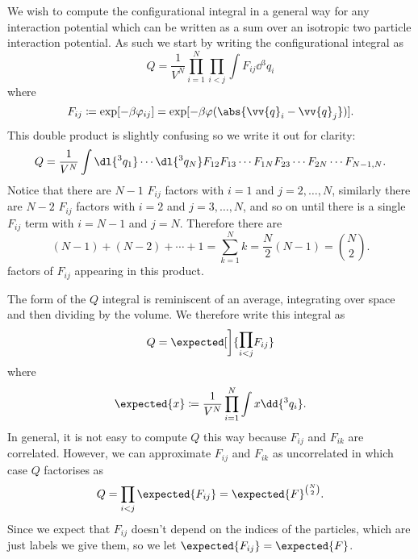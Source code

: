 \documentclass[fleqn]{NotesClass}
\begin{document}
    We wish to compute the configurational integral in a general way for any interaction potential which can be written as a sum over an isotropic two particle interaction potential.
    As such we start by writing the configurational integral as
    \begin{equation}
        Q = \frac{1}{V^N} \prod_{i = 1}^{N} \prod_{i < j} \int F_{ij} \dd{^3q_i}
    \end{equation}
    where
    \begin{equation}
        F_{ij} \coloneqq \exp[-\beta \varphi_{ij}] = \exp[-\beta \varphi(\abs{\vv{q}_i - \vv{q}_j})].
    \end{equation}
    This double product is slightly confusing so we write it out for clarity:
    \begin{equation}
        Q = \frac{1}{V^N} \int \dl{^3q_1} \dotsm \dl{^3q_N} F_{12}F_{13} \dotsm F_{1N}F_{23} \dotsm F_{2N} \dotsm F_{N-1,N}.
    \end{equation}
    Notice that there are \(N - 1\) \(F_{ij}\) factors with \(i = 1\) and \(j = 2, \dotsc, N\), similarly there are \(N - 2\) \(F_{ij}\) factors with \(i = 2\) and \(j = 3, \dotsc, N\), and so on until there is a single \(F_{ij}\) term with \(i = N - 1\) and \(j = N\).
    Therefore there are
    \begin{equation}
        (N - 1) + (N - 2) + \dotsb + 1 = \sum_{k = 1}^{N} k = \frac{N}{2}(N - 1) = \binom{N}{2}.
    \end{equation}
    factors of \(F_{ij}\) appearing in this product.
    
    The form of the \(Q\) integral is reminiscent of an average, integrating over space and then dividing by the volume.
    We therefore write this integral as
    \begin{equation}
        Q = \expected[\bigg]{ \raisebox{0.6ex}{\(\displaystyle\prod_{\smash{i < j}}\)} F_{ij} }
    \end{equation}
    where
    \begin{equation}
        \expected{x} \coloneqq \frac{1}{V^N}\prod_{i=1}^{N} \int x \dd{^3q_i}.
    \end{equation}
    In general, it is not easy to compute \(Q\) this way because \(F_{ij}\) and \(F_{ik}\) are correlated.
    However, we can approximate \(F_{ij}\) and \(F_{ik}\) as uncorrelated in which case \(Q\) factorises as
    \begin{equation}
        Q = \prod_{i < j} \expected{F_{ij}} = \expected{F}^{\binom{N}{2}}.
    \end{equation}
    Since we expect that \(F_{ij}\) doesn't depend on the indices of the particles, which are just labels we give them, so we let \(\expected{F_{ij}} = \expected{F}\).
    
\end{document}
